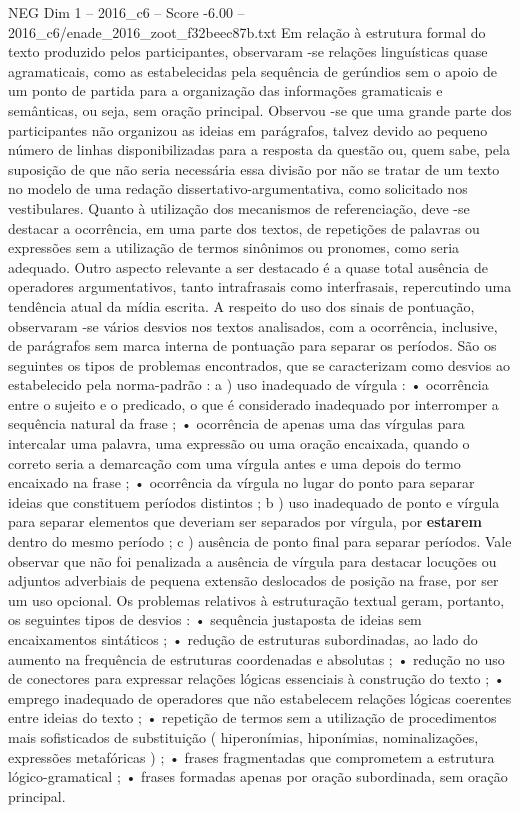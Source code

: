 \begin{textsample}{NEG Dim 1 – 2016\_c6 – Score -6.00 – 2016\_c6/enade\_2016\_zoot\_f32beec87b.txt}
Em relação à estrutura formal do texto produzido pelos participantes, observaram -se relações linguísticas quase agramaticais, como as estabelecidas pela sequência de gerúndios sem o apoio de um ponto de partida para a organização das informações gramaticais e semânticas, ou seja, sem oração principal.
Observou -se que uma grande parte dos participantes não organizou as ideias em parágrafos, talvez devido ao pequeno número de linhas disponibilizadas para a resposta da questão ou, quem sabe, pela suposição de que não seria necessária essa divisão por não se tratar de um texto no modelo de uma redação dissertativo-argumentativa, como solicitado nos vestibulares.
Quanto à utilização dos mecanismos de referenciação, deve -se destacar a ocorrência, em uma parte dos textos, de repetições de palavras ou expressões sem a utilização de termos sinônimos ou pronomes, como seria adequado.
Outro aspecto relevante a ser destacado é a quase total ausência de operadores argumentativos, tanto intrafrasais como interfrasais, repercutindo uma tendência atual da mídia escrita.
A respeito do uso dos sinais de pontuação, observaram -se vários desvios nos textos analisados, com a ocorrência, inclusive, de parágrafos sem marca interna de pontuação para separar os períodos.
São os seguintes os tipos de problemas encontrados, que se caracterizam como desvios ao estabelecido pela norma-padrão : a ) uso inadequado de vírgula : • ocorrência entre o sujeito e o predicado, o que é considerado inadequado por interromper a sequência natural da frase ; • ocorrência de apenas uma das vírgulas para intercalar uma palavra, uma expressão ou uma oração encaixada, quando o correto seria a demarcação com uma vírgula antes e uma depois do termo encaixado na frase ; • ocorrência da vírgula no lugar do ponto para separar ideias que constituem períodos distintos ; b ) uso inadequado de ponto e vírgula para separar elementos que deveriam ser separados por vírgula, por \textbf{estarem} dentro do mesmo período ; c ) ausência de ponto final para separar períodos.
Vale observar que não foi penalizada a ausência de vírgula para destacar locuções ou adjuntos adverbiais de pequena extensão deslocados de posição na frase, por ser um uso opcional.
Os problemas relativos à estruturação textual geram, portanto, os seguintes tipos de desvios : • sequência justaposta de ideias sem encaixamentos sintáticos ; • redução de estruturas subordinadas, ao lado do aumento na frequência de estruturas coordenadas e absolutas ; • redução no uso de conectores para expressar relações lógicas essenciais à construção do texto ; • emprego inadequado de operadores que não estabelecem relações lógicas coerentes entre ideias do texto ; • repetição de termos sem a utilização de procedimentos mais sofisticados de substituição ( hiperonímias, hiponímias, nominalizações, expressões metafóricas ) ; • frases fragmentadas que comprometem a estrutura lógico-gramatical ; • frases formadas apenas por oração subordinada, sem oração principal.

\end{textsample}
